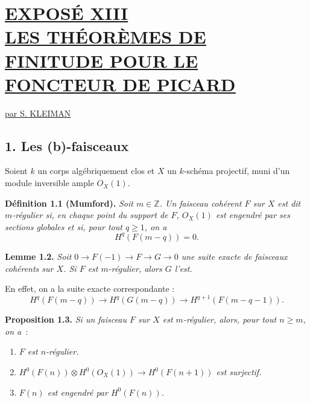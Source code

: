 
\section*{\underline{EXPOS\'E XIII}\\[3pt] \underline{\underline{LES TH\'EOR\`EMES DE FINITUDE POUR LE FONCTEUR DE PICARD}}}
\begin{center}
\underline{par S. KLEIMAN}
\end{center}

\subsection*{1. Les (b)-faisceaux}
Soient $k$ un corps alg\'ebriquement clos et $X$ un $k$-sch\'ema projectif, muni d'un module inversible ample ${O}_X(1)$.

\textbf{D\'efinition 1.1 (Mumford).} \emph{Soit $m\in\mathbb Z$. Un faisceau coh\'erent $F$ sur $X$ est dit \emph{$m$-r\'egulier} si, en chaque point du support de $F$, ${O}_X(1)$ est engendr\'e par ses sections globales et si, pour tout $q\ge1$, on a}
\[
 H^q(F(m-q))=0.
\]

\textbf{Lemme 1.2.} \emph{Soit \(0\longrightarrow F(-1)\longrightarrow F\longrightarrow G\longrightarrow 0\) une suite exacte de faisceaux coh\'erents sur $X$}\emph{. Si $F$ est $m$-r\'egulier, alors $G$ l'est.}

En effet, on a la suite exacte correspondante :
\[
H^q(F(m-q))\longrightarrow H^q(G(m-q))\longrightarrow H^{q+1}(F(m-q-1)).
\]

\textbf{Proposition 1.3.} \emph{Si un faisceau $F$ sur $X$ est $m$-r\'egulier, alors, pour tout $n\ge m$, on a}~:
\begin{enumerate}[label=(\roman*)]
\item \emph{$F$ est $n$-r\'egulier.}
\item \emph{\(H^0(F(n))\otimes H^0({O}_X(1))\longrightarrow H^0(F(n+1))\) est surjectif.}
\item \emph{$F(n)$ est engendr\'e par \(H^0(F(n))\).}
\end{enumerate}

